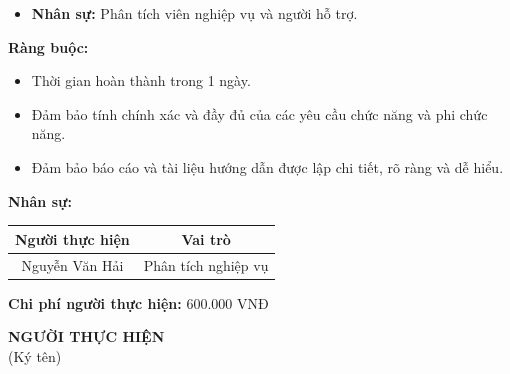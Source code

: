 {\begin{minipage}{\textwidth}
\begin{itemize}
            \item \textbf{Nhân sự:} Phân tích viên nghiệp vụ và người hỗ trợ.
        \end{itemize}
        \noindent \textbf{Ràng buộc:}
        \begin{itemize}
            \item Thời gian hoàn thành trong 1 ngày.
            \item Đảm bảo tính chính xác và đầy đủ của các yêu cầu chức năng và phi chức năng.
            \item Đảm bảo báo cáo và tài liệu hướng dẫn được lập chi tiết, rõ ràng và dễ hiểu.
        \end{itemize}
        \noindent \textbf{Nhân sự:}
        \begin{longtable}{|c|c|}
        \hline
        \textbf{Người thực hiện} & \textbf{Vai trò} \\
        \hline
        Nguyễn Văn Hải & Phân tích nghiệp vụ \\
        \hline
        \end{longtable}
        \noindent \textbf{Chi phí người thực hiện:} 600.000 VNĐ
        \vspace{1cm}
        \begin{flushleft}
            \hspace{8cm} \textbf{NGƯỜI THỰC HIỆN} \\
            \hspace{9.5cm} (Ký tên) \\
            \vspace{1cm}
        \end{flushleft}
    \end{minipage}
}
